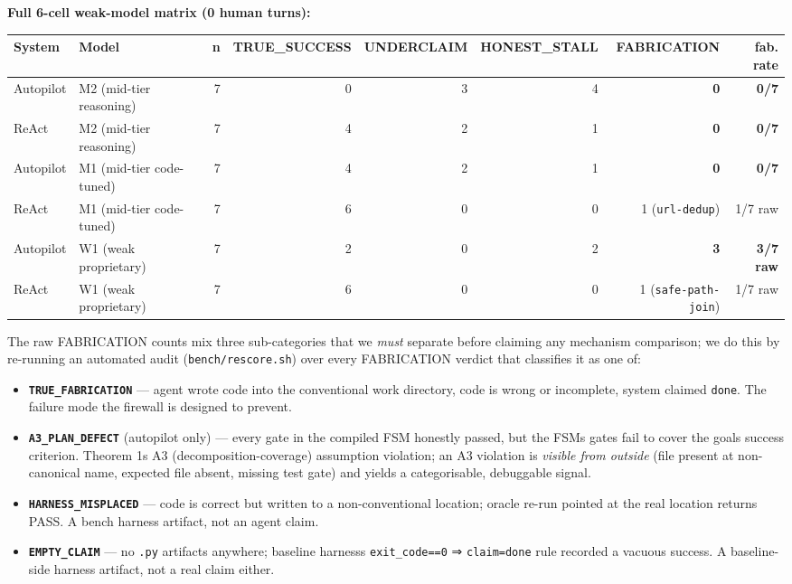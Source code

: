 \textbf{Full 6-cell weak-model matrix (0 human turns):}

\begin{longtable}[]{@{}llrrrrrr@{}}
\toprule\noalign{}
System & Model & n & TRUE\_SUCCESS & UNDERCLAIM & HONEST\_STALL & FABRICATION & fab. rate \\
\midrule\noalign{}
\endhead
\bottomrule\noalign{}
\endlastfoot
Autopilot & M2 (mid-tier reasoning) & 7 & 0 & 3 & 4 & \textbf{0} & \textbf{0/7} \\
ReAct & M2 (mid-tier reasoning) & 7 & 4 & 2 & 1 & \textbf{0} & \textbf{0/7} \\
Autopilot & M1 (mid-tier code-tuned) & 7 & 4 & 2 & 1 & \textbf{0} & \textbf{0/7} \\
ReAct & M1 (mid-tier code-tuned) & 7 & 6 & 0 & 0 & 1 (\texttt{url-dedup}) & 1/7 raw \\
Autopilot & W1 (weak proprietary) & 7 & 2 & 0 & 2 & \textbf{3} & \textbf{3/7 raw} \\
ReAct & W1 (weak proprietary) & 7 & 6 & 0 & 0 & 1 (\texttt{safe-path-join}) & 1/7 raw \\
\end{longtable}

The raw FABRICATION counts mix three sub-categories that we \emph{must} separate before claiming any
mechanism comparison; we do this by re-running an automated audit (\texttt{bench/rescore.sh}) over every
FABRICATION verdict that classifies it as one of:

\begin{itemize}
\tightlist
\item
  \textbf{\texttt{TRUE\_FABRICATION}} --- agent wrote code into the conventional work directory, code is
  wrong or incomplete, system claimed \texttt{done}. The failure mode the firewall is designed to prevent.
\item
  \textbf{\texttt{A3\_PLAN\_DEFECT}} (autopilot only) --- every gate in the compiled FSM honestly passed, but the
  FSM\textquotesingle s gates fail to cover the goal\textquotesingle s success criterion. Theorem 1\textquotesingle s A3 (decomposition-coverage)
  assumption violation; an A3 violation is \emph{visible from outside} (file present at non-canonical
  name, expected file absent, missing test gate) and yields a categorisable, debuggable signal.
\item
  \textbf{\texttt{HARNESS\_MISPLACED}} --- code is correct but written to a non-conventional location; oracle
  re-run pointed at the real location returns PASS. A bench harness artifact, not an agent claim.
\item
  \textbf{\texttt{EMPTY\_CLAIM}} --- no \texttt{.py} artifacts anywhere; baseline harness\textquotesingle s \texttt{exit\_code==0} ⇒ \texttt{claim=done}
  rule recorded a vacuous success. A baseline-side harness artifact, not a real claim either.
\end{itemize}

